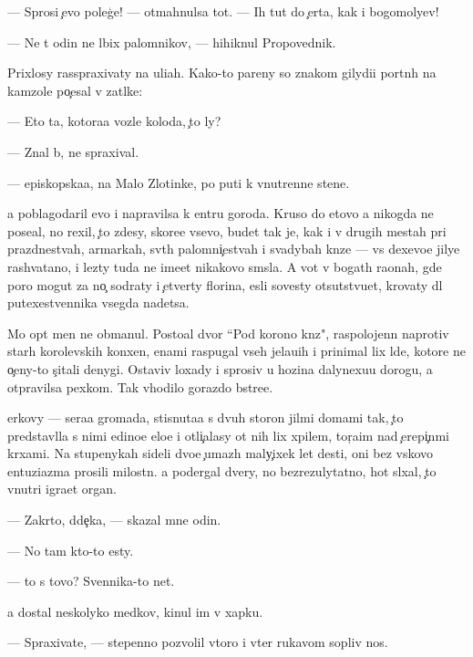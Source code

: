 \documentclass[10pt]{book}
\begin{document}
— Sprosi {\c}evo poleg{\c}e! — otmahnulsa tot. — Ih tut do {\c}erta, kak i bogomoly{\q}ev!

— Ne t{\yi} odin ne l{\iu}bix palomnikov, — hihiknul Propovednik.

Prixlosy rasspraxivaty na uli{\q}ah. Kako{\y}-to pareny so znakom gilydi{\y}i portn{\yi}h na kamzole po{\c}esal v zat{\yi}lke:

— Eto ta, kotora{\y}a vozle kolod{\q}a, {\c}to ly?

— Znal b{\yi}, ne spraxival.

— {\Y}episkopska{\y}a, na Malo{\y} Zlotinke, po puti k vnutrenne{\y} stene.

{\Y}a poblagodaril {\y}evo i napravilsa k {\q}entru goroda. Kruso do etovo {\y}a nikogda ne pose{\x}al, no rexil, {\c}to zdesy, skore{\y}e vsevo, budet tak je, kak i v drugih mestah pri prazdnestvah, {\y}armarkah, sv{\ia}t{\yi}h palomni{\c}estvah i svadybah kn{\ia}ze{\y} — vs{\e} dexevo{\y}e jilye rashvatano, i lezty tuda ne ime{\y}et nikakovo sm{\yi}sla. A vot v bogat{\yi}h ra{\y}onah, gde poro{\y} mogut za no{\c} sodraty i {\c}etverty florina, {\y}esli sovesty otsutstvu{\y}et, krovaty dl{\ia} putexestvennika vsegda na{\y}detsa.

Mo{\y} op{\yi}t men{\ia} ne obmanul. Posto{\y}al{\yi}{\y} dvor ``Pod korono{\y} kn{\ia}z{\ia}", raspolojenn{\yi}{\y} naprotiv star{\yi}h korolevskih kon{\iu}xen, {\q}enami raspugal vseh jela{\y}u{\x}ih i prinimal lix l{\iu}de{\y}, kotor{\yi}{\y}e ne o{\c}eny-to s{\c}itali denygi. Ostaviv loxady i sprosiv u hoz{\ia}{\y}ina dalyne{\y}xu{\y}u dorogu, {\y}a otpravilsa pexkom. Tak v{\yi}hodilo gorazdo b{\yi}stre{\y}e.

{\Q}erkovy — sera{\y}a gromada, stisnuta{\y}a s dvuh storon jil{\yi}mi domami tak, {\c}to predstavl{\ia}la s nimi {\y}edino{\y}e {\q}elo{\y}e i otli{\c}alasy ot nih lix xpilem, tor{\c}a{\x}im nad {\c}erepi{\c}n{\yi}mi kr{\yi}xami. Na stupenykah sideli dvo{\y}e {\c}umaz{\yi}h maly{\c}ixek let des{\ia}ti, oni bez vs{\ia}kovo entuziazma prosili milost{\yi}n{\iu}. {\Y}a podergal dvery, no bezrezulytatno, hot{\ia} sl{\yi}xal, {\c}to vnutri igra{\y}et organ.

— Zakr{\yi}to, d{\ia}de{\c}ka, — skazal mne odin.

— No tam kto-to {\y}esty.

— {\C}to s tovo? Sv{\ia}{\x}ennika-to net.

{\Y}a dostal neskolyko med{\ia}kov, kinul im v xapku.

— Spraxiva{\y}te, — stepenno pozvolil vtoro{\y} i v{\yi}ter rukavom sopliv{\yi}{\y} nos.
\end{document}
